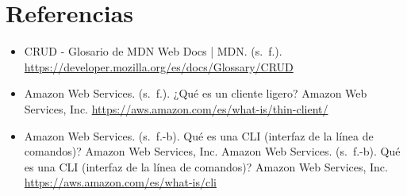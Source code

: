 \documentclass[12pt]{article}
\begin{document}
\section{Referencias}
\begin{itemize}
    \item CRUD - Glosario de MDN Web Docs | MDN. (s. f.). \url{https://developer.mozilla.org/es/docs/Glossary/CRUD}
    \item Amazon Web Services. (s. f.). ¿Qué es un cliente ligero? Amazon Web Services, Inc. \url{https://aws.amazon.com/es/what-is/thin-client/}
    \item Amazon Web Services. (s. f.-b). Qué es una CLI (interfaz de la línea de comandos)? Amazon Web Services, Inc. Amazon Web Services. (s. f.-b). Qué es una CLI (interfaz de la línea de comandos)? Amazon Web Services, Inc. \url {https://aws.amazon.com/es/what-is/cli}
\end{itemize}
\end{document}
